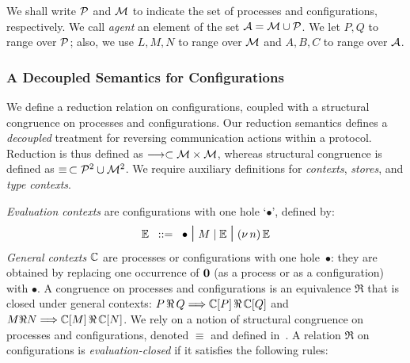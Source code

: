 \documentclass[runningheads]{llncs}
\begin{document}
\noindent
We shall write $\mathcal{P}$ and $\mathcal{M}$ to indicate the set of processes and configurations, respectively. 
We call \emph{agent} an element of the set $\mathcal{A} = \mathcal{M} \cup \mathcal{P}$. 
We let $P, Q$  to range over $\mathcal{P}$; also, we use $L,M,N$ to range over $\mathcal{M}$ and $A,B,C$ to range over $\mathcal{A}$.





\subsubsection{A Decoupled Semantics for Configurations}\label{ss:semconf}
We define a reduction relation on configurations, coupled with a structural congruence
 on processes and configurations.
Our reduction semantics defines a \emph{decoupled} treatment for reversing communication actions within a protocol.
Reduction is thus defined as $\longrightarrow \subset \mathcal{M} \times \mathcal{M}$, whereas structural congruence is defined as $\equiv\, \subset \mathcal{P}^{2} \cup \mathcal{M}^{2}$.  We require auxiliary definitions for \emph{contexts}, \emph{stores}, and \emph{type contexts}.

\emph{Evaluation contexts} are configurations with one hole 
 `$\bullet$',  defined by:
$$\mathbb{E}\;\;::=\;\; \bullet \;\mbox{\Large{$\mid$}}\; M\;|\; \mathbb{E} \;\mbox{\Large{$\mid$}}\; (\nu\, n)\, \mathbb{E}$$
\emph{General contexts} $\mathbb{C}$ are processes or configurations with one hole~$\bullet$: they are obtained  by replacing one occurrence of $\mathbf{0}$ (as a process or as a configuration) with $\bullet$.
A congruence on processes and configurations is an equivalence  $\Re$ that is closed under general contexts: $P \,\Re\,  Q \Longrightarrow \mathbb{C}[P]\,\Re\,  \mathbb{C}[Q]$
and $M\Re N \Longrightarrow \mathbb{C}[M]\,\Re\,  \mathbb{C}[N]$.
We rely on a notion of structural congruence on processes and configurations, denoted $\equiv$ and defined in~\cite{DBLP:conf/ppdp/MezzinaP17}.
A relation $\Re$ on configurations is \emph{evaluation-closed} if it satisfies the   following rules:
\end{document}
